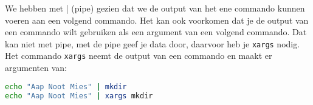 We hebben met | (pipe) gezien dat we de output van het ene commando kunnen voeren aan een volgend commando. Het kan ook voorkomen dat je de output van een commando wilt gebruiken als een argument van een volgend commando. Dat kan niet met pipe, met de pipe geef je data door, daarvoor heb je \texttt{xargs} nodig. Het commando \texttt{xargs} neemt de output van een commando en maakt er argumenten van:
\begin{lstlisting}[language=bash]
echo "Aap Noot Mies" | mkdir
echo "Aap Noot Mies" | xargs mkdir
\end{lstlisting}

